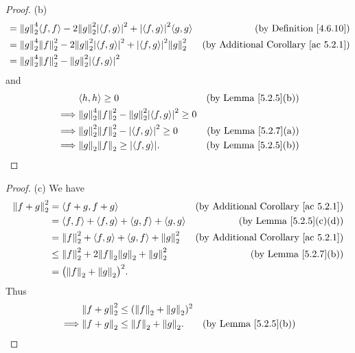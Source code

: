 \begin{proof}{(b)}
\begin{align*}
         & = \norm*{g}_2^4 \inner*{f, f} - 2 \norm*{g}_2^2 \abs*{\inner*{f, g}}^2 + \abs*{\inner*{f, g}}^2 \inner*{g, g}            & \text{(by Definition \ref{4.6.10})}             \\
         & = \norm*{g}_2^4 \norm*{f}_2^2 - 2 \norm*{g}_2^2 \abs*{\inner*{f, g}}^2 + \abs*{\inner*{f, g}}^2 \norm*{g}_2^2            & \text{(by Additional Corollary \ref{ac 5.2.1})} \\
         & = \norm*{g}_2^4 \norm*{f}_2^2 - \norm*{g}_2^2 \abs*{\inner*{f, g}}^2
    \end{align*}
    and
    \begin{align*}
                 & \inner*{h, h} \geq 0                                                      & \text{(by Lemma \ref{5.2.5}(b))} \\
        \implies & \norm*{g}_2^4 \norm*{f}_2^2 - \norm*{g}_2^2 \abs*{\inner*{f, g}}^2 \geq 0                                    \\
        \implies & \norm*{g}_2^2 \norm*{f}_2^2 - \abs*{\inner*{f, g}}^2 \geq 0               & \text{(by Lemma \ref{5.2.7}(a))} \\
        \implies & \norm*{g}_2 \norm*{f}_2 \geq \abs*{\inner*{f, g}}.                        & \text{(by Lemma \ref{5.2.5}(b))}
    \end{align*}
\end{proof}

\begin{proof}{(c)}
    We have
    \begin{align*}
        \norm*{f + g}_2^2 & = \inner*{f + g, f + g}                                         & \text{(by Additional Corollary \ref{ac 5.2.1})} \\
                          & = \inner*{f, f} + \inner*{f, g} + \inner*{g, f} + \inner*{g, g} & \text{(by Lemma \ref{5.2.5}(c)(d))}             \\
                          & = \norm*{f}_2^2 + \inner*{f, g} + \inner*{g, f} + \norm*{g}_2^2 & \text{(by Additional Corollary \ref{ac 5.2.1})} \\
                          & \leq \norm*{f}_2^2 + 2 \norm*{f}_2 \norm*{g}_2 + \norm*{g}_2^2  & \text{(by Lemma \ref{5.2.7}(b))}                \\
                          & = \big(\norm*{f}_2 + \norm*{g}_2\big)^2.
    \end{align*}
    Thus
    \begin{align*}
                 & \norm*{f + g}_2^2 \leq (\norm*{f}_2 + \norm*{g}_2)^2                                    \\
        \implies & \norm*{f + g}_2 \leq \norm*{f}_2 + \norm*{g}_2.      & \text{(by Lemma \ref{5.2.5}(b))}
    \end{align*}
\end{proof}

